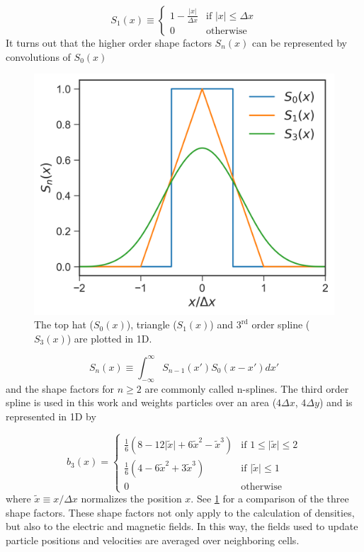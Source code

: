 \begin{equation}
	S_1(x) \equiv \begin{cases}
		1-\frac{\lvert x \rvert}{\Delta x} & \text{if } \lvert x \rvert \leq \Delta x \\
		0 & \text{otherwise}
	\end{cases} \label{eq:triangle}
\end{equation}
It turns out that the higher order shape factors $S_n(x)$ can be represented by convolutions of $S_0(x)$ 

\begin{figure}
	\centering 
	\includegraphics[width=0.6\linewidth]{planning/images/shape_functions.png}
	\caption{The top hat ($S_0(x)$), triangle ($S_1(x)$) and $3^\text{rd}$ order spline ($S_3(x)$) are plotted in 1D.}
	\label{fig:shape_factors}
\end{figure}

\begin{equation}
	S_n(x) \equiv \int_{-\infty}^\infty S_{n-1}(x')S_0(x-x') dx'
\end{equation}
and the shape factors for $n \geq 2$ are commonly called n-splines. The third order spline is used in this work and weights particles over an area ($4 \Delta x$, $4 \Delta y$) and is represented in 1D by 

\begin{equation}
	b_3(x) = \begin{cases}
		\frac{1}{6}(8 - 12 \lvert \tilde{x} \rvert + 6 \tilde{x}^2 - \tilde{x}^3) & \text{if } 1 \leq \lvert \tilde{x} \rvert \leq 2 \\
		\frac{1}{6}(4 - 6 \tilde{x}^2 + 3 \tilde{x}^3) & \text{if } \lvert \tilde{x} \rvert \leq 1 \\
		0 & \text{otherwise}
	\end{cases}
\end{equation}
where $\tilde{x} \equiv x / \Delta x$ normalizes the position $x$. See \cref{fig:shape_factors} for a comparison of the three shape factors. These shape factors not only apply to the calculation of densities, but also to the electric and magnetic fields. In this way, the fields used to update particle positions and velocities are averaged over neighboring cells.

